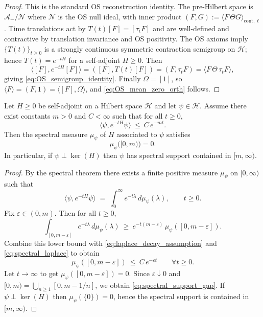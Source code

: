 \begin{proof}
This is the standard OS reconstruction identity.
The pre-Hilbert space is $\mathcal A_+/\mathcal N$ where $\mathcal N$ is the OS null ideal, with inner product
$(F,G):=\langle F\,\Theta G\rangle_{\mathrm{cont},\ell}$.
Time translations act by $T(t)[F]=[\tau_t F]$ and are well-defined and contractive by translation invariance and OS positivity.
The OS axioms imply $\{T(t)\}_{t\ge 0}$ is a strongly continuous symmetric contraction semigroup on $\mathcal H$;
hence $T(t)=e^{-tH}$ for a self-adjoint $H\ge 0$.
Then
\[\langle [F],e^{-tH}[F]\rangle=( [F],T(t)[F])=(F,\tau_t F)=\langle F\,\Theta\,\tau_t F\rangle,\]
giving \eqref{eq:OS_semigroup_identity}.
Finally $\Omega=[1]$, so $\langle F\rangle=(F,1)=\langle [F],\Omega\rangle$, and \eqref{eq:OS_mean_zero_orth} follows.
\end{proof}

\begin{lemma}
\label{lem:laplace_gap_criterion}
Let $H\ge 0$ be self-adjoint on a Hilbert space $\mathcal H$ and let $\psi\in\mathcal H$.
Assume there exist constants $m>0$ and $C<\infty$ such that for all $t\ge 0$,
\begin{equation}
 \langle \psi, e^{-tH}\psi\rangle\ \le\ C\,e^{-m t}.
 \label{eq:laplace_decay_assumption}
\end{equation}
Then the spectral measure $\mu_{\psi}$ of $H$ associated to $\psi$ satisfies
\begin{equation}
 \mu_{\psi}\big([0,m)\big)=0.
 \label{eq:spectral_support_gap}
\end{equation}
In particular, if $\psi\perp\ker(H)$ then $\psi$ has spectral support contained in $[m,\infty)$.
\end{lemma}

\begin{proof}
By the spectral theorem there exists a finite positive measure $\mu_{\psi}$ on $[0,\infty)$ such that
\begin{equation}
 \langle \psi, e^{-tH}\psi\rangle\;=\;\int_{0}^{\infty} e^{-t\lambda}\,d\mu_{\psi}(\lambda),
 \qquad t\ge 0.
 \label{eq:spectral_laplace}
\end{equation}
Fix $\varepsilon\in(0,m)$. Then for all $t\ge 0$,
\[
\int_{[0,m-\varepsilon]} e^{-t\lambda}\,d\mu_{\psi}(\lambda)
\ \ge\ e^{-t(m-\varepsilon)}\,\mu_{\psi}([0,m-\varepsilon]).
\]
Combine this lower bound with \eqref{eq:laplace_decay_assumption} and \eqref{eq:spectral_laplace} to obtain
\[
\mu_{\psi}([0,m-\varepsilon])
\ \le\ C\,e^{-\varepsilon t}\qquad\forall t\ge 0.
\]
Let $t\to\infty$ to get $\mu_{\psi}([0,m-\varepsilon])=0$.
Since $\varepsilon\downarrow 0$ and $[0,m)=\bigcup_{n\ge 1}[0,m-1/n]$, we obtain \eqref{eq:spectral_support_gap}.
If $\psi\perp\ker(H)$ then $\mu_{\psi}(\{0\})=0$, hence the spectral support is contained in $[m,\infty)$.
\end{proof}


